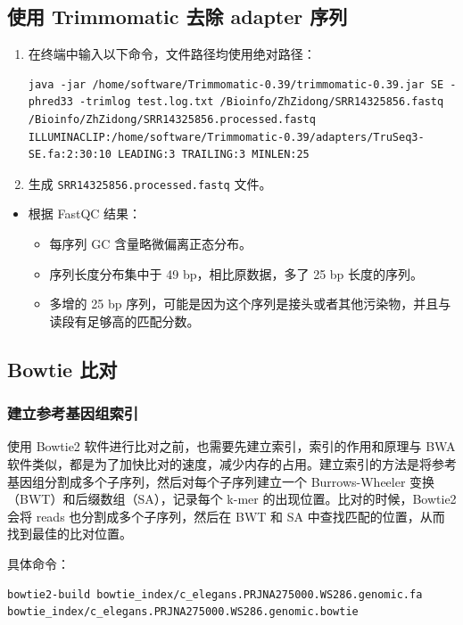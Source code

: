 \documentclass[UTF8]{ctexart}
\begin{document}
\subsection{ 使用 Trimmomatic 去除 adapter 序列}

\begin{enumerate}
	\item 在终端中输入以下命令，文件路径均使用绝对路径：
	\begin{lstlisting}
java -jar /home/software/Trimmomatic-0.39/trimmomatic-0.39.jar SE -phred33 -trimlog test.log.txt /Bioinfo/ZhZidong/SRR14325856.fastq /Bioinfo/ZhZidong/SRR14325856.processed.fastq ILLUMINACLIP:/home/software/Trimmomatic-0.39/adapters/TruSeq3-SE.fa:2:30:10 LEADING:3 TRAILING:3 MINLEN:25 
	\end{lstlisting}
	\item 生成 \verb|SRR14325856.processed.fastq| 文件。
\end{enumerate}

\begin{itemize}
	\item 根据 FastQC 结果：
	\begin{itemize}
		\item 每序列 GC 含量略微偏离正态分布。
		\item 序列长度分布集中于 49 bp，相比原数据，多了 25 bp 长度的序列。
		\item 多增的 25 bp 序列，可能是因为这个序列是接头或者其他污染物，并且与读段有足够高的匹配分数。
	\end{itemize}
\end{itemize}

\subsection{Bowtie 比对}

\subsubsection{建立参考基因组索引}

使用 Bowtie2 软件进行比对之前，也需要先建立索引，索引的作用和原理与 BWA 软件类似，都是为了加快比对的速度，减少内存的占用。建立索引的方法是将参考基因组分割成多个子序列，然后对每个子序列建立一个 Burrows-Wheeler 变换（BWT）和后缀数组（SA），记录每个 k-mer 的出现位置。比对的时候，Bowtie2 会将 reads 也分割成多个子序列，然后在 BWT 和 SA 中查找匹配的位置，从而找到最佳的比对位置。

具体命令：

\begin{lstlisting}
bowtie2-build bowtie_index/c_elegans.PRJNA275000.WS286.genomic.fa bowtie_index/c_elegans.PRJNA275000.WS286.genomic.bowtie
\end{lstlisting}
\end{document}
